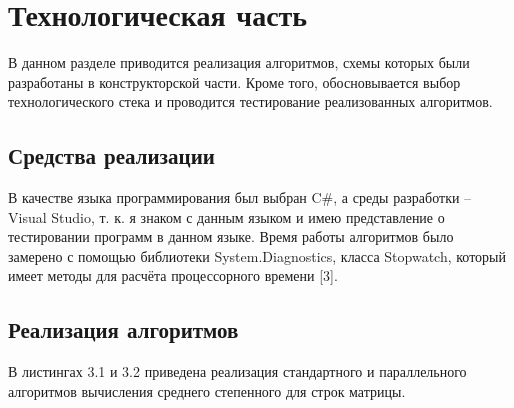 \documentclass[12pt]{report}
\begin{document}
\chapter{Технологическая часть}
В данном разделе приводится реализация алгоритмов, схемы которых были разработаны в конструкторской части. Кроме того, обосновывается выбор технологического стека и проводится тестирование реализованных алгоритмов.

\section{Средства реализации}

В качестве языка программирования был выбран C\#, а среды разработки -- Visual Studio, т. к. я знаком с данным языком и имею представление о тестировании программ в данном языке. Время работы алгоритмов было замерено с помощью библиотеки System.Diagnostics, класса Stopwatch, который имеет методы для расчёта процессорного времени [3].


\section{Реализация алгоритмов}

В листингах 3.1 и 3.2 приведена реализация стандартного и параллельного алгоритмов вычисления среднего степенного для строк матрицы.
\end{document}
